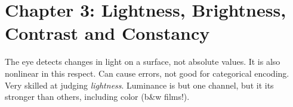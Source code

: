 \section{Chapter 3: Lightness, Brightness, Contrast and Constancy}
\graphicspath{ {pngs/ch3/} }



\secttoc

    The eye detects changes in light on a surface, not absolute values. It is
    also nonlinear in this respect. Can cause errors, not good for categorical
    encoding. Very skilled at judging \emph{lightness}.
    Luminance is but one channel, but it its stronger than others, including
    color (b\&w films!).

